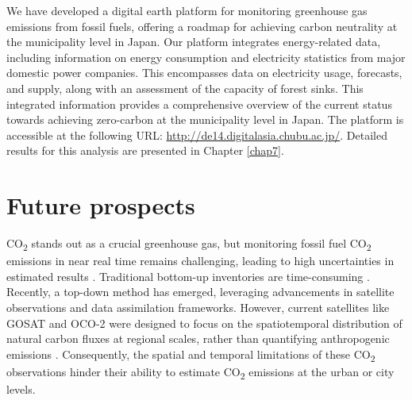 We have developed a digital earth platform for monitoring greenhouse gas emissions from fossil fuels, offering a roadmap for achieving carbon neutrality at the municipality level in Japan. Our platform integrates energy-related data, including information on energy consumption and electricity statistics from major domestic power companies. This encompasses data on electricity usage, forecasts, and supply, along with an assessment of the capacity of forest sinks. This integrated information provides a comprehensive overview of the current status towards achieving zero-carbon at the municipality level in Japan. The platform is accessible at the following URL: \url{http://de14.digitalasia.chubu.ac.jp/}. Detailed results for this analysis are presented in Chapter \ref{chap7}.\par

\section{Future prospects}
CO\textsubscript{2} stands out as a crucial greenhouse gas, but monitoring fossil fuel CO\textsubscript{2} emissions in near real time remains challenging, leading to high uncertainties in estimated results \citep{marland2008uncertainties}. Traditional bottom-up inventories are time-consuming \citep{marland2008uncertainties}. Recently, a top-down method has emerged, leveraging advancements in satellite observations and data assimilation frameworks. However, current satellites like GOSAT and OCO-2 were designed to focus on the spatiotemporal distribution of natural carbon fluxes at regional scales, rather than quantifying anthropogenic emissions \citep{nassar2017quantifying, yang2023using}. Consequently, the spatial and temporal limitations of these CO\textsubscript{2} observations hinder their ability to estimate CO\textsubscript{2} emissions at the urban or city levels. \par


